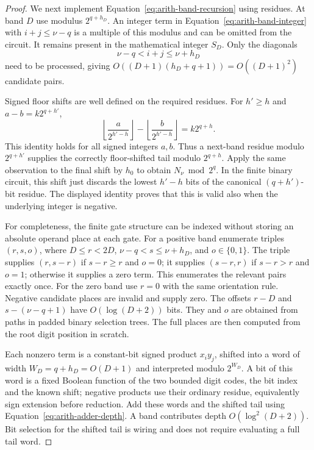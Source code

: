 \begin{proof}
We next implement Equation~\eqref{eq:arith-band-recursion} using
residues.  At band $D$ use modulus $2^{q+h_D}$.  An integer term
in Equation~\eqref{eq:arith-band-integer} with $i+j\leq \nu-q$
is a multiple of this modulus and can be omitted from the circuit.
It remains present in the mathematical integer $S_D$.
Only the diagonals
\begin{equation}
 \nu-q<i+j\leq \nu+h_D
 \label{eq:arith-relevant-diagonals}
\end{equation}
need to be processed, giving
$O((D+1)(h_D+q+1))=O((D+1)^2)$ candidate pairs.

Signed floor shifts are well defined on the required residues.
For $h'\geq h$ and $a-b=k2^{q+h'}$,
\begin{equation}
 \left\lfloor\frac{a}{2^{h'-h}}\right\rfloor
 -\left\lfloor\frac{b}{2^{h'-h}}\right\rfloor
       =k2^{q+h}.
 \label{eq:arith-signed-residue-floor}
\end{equation}
This identity holds for all signed integers $a,b$.  Thus a next-band
residue modulo $2^{q+h'}$ supplies the correctly floor-shifted
tail modulo $2^{q+h}$.  Apply the same observation to the final
shift by $h_0$ to obtain $N_\nu\bmod2^q$.
In the finite binary circuit, this shift just discards the lowest
$h'-h$ bits of the canonical $(q+h')$-bit residue.  The displayed
identity proves that this is valid also when the underlying integer
is negative.

For completeness, the finite gate structure can be indexed without
storing an absolute operand place at each gate.  For a positive
band enumerate triples $(r,s,o)$, where
$D\leq r<2D$, $\nu-q<s\leq \nu+h_D$, and $o\in\{0,1\}$.
The triple supplies $(r,s-r)$ if $s-r\geq r$ and $o=0$;
it supplies $(s-r,r)$ if $s-r>r$ and $o=1$; otherwise it supplies
a zero term.  This enumerates the relevant pairs exactly once.
For the zero band use $r=0$ with the same orientation rule.
Negative candidate places are invalid and supply zero.
The offsets $r-D$ and $s-(\nu-q+1)$ have $O(\log(D+2))$ bits.
They and $o$ are obtained from paths in padded binary selection trees.
The full places are then computed from the root digit position in scratch.

Each nonzero term is a constant-bit signed product $x_i y_j$,
shifted into a word of width $W_D=q+h_D=O(D+1)$ and interpreted
modulo $2^{W_D}$.  A bit of this word is a fixed Boolean function
of the two bounded digit codes, the bit index and the known shift;
negative products use their ordinary residue, equivalently sign
extension before reduction.  Add these words and the shifted tail
using Equation~\eqref{eq:arith-adder-depth}.  A band contributes
depth $O(\log^2(D+2))$.  Bit selection for the shifted tail is
wiring and does not require evaluating a full tail word.


\end{proof}
